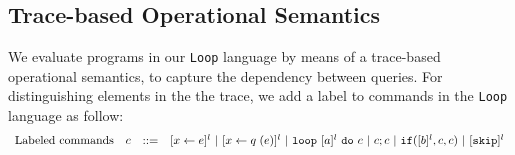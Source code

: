 

\subsection{ Trace-based Operational Semantics}
 We evaluate programs in our {\tt Loop} language by means of a trace-based operational semantics, to capture the dependency between queries. For distinguishing elements in the the trace, we add a label to commands in the {\tt Loop} language as follow:
%
\[
\begin{array}{llll}
     \mbox{Labeled commands} & c & ::= &   [\mathrel{ x \leftarrow e }]^{l} ~|~  [\mathrel{ x \leftarrow q }(e)]^{l}
 ~|~  \mathtt{loop} ~ [a]^{l} ~ \mathtt{do} ~ c  ~|~ c;c  ~|~ \mathtt{if}([b]^l, c, c) 	 ~|~ [\mathtt{skip}]^{l} \\
\end{array}
\]

